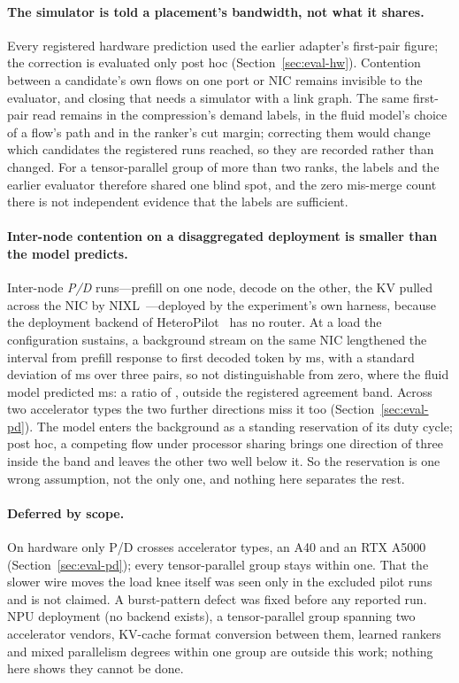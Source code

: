 \paragraph{The simulator is told a placement's bandwidth, not what it shares.}
Every registered hardware prediction used the earlier adapter's first-pair
figure; the correction is evaluated only post hoc (Section~\ref{sec:eval-hw}).
Contention between a candidate's own flows on one port or NIC remains
invisible to the evaluator, and closing that needs a simulator with a link
graph. The same first-pair read remains in the compression's demand labels,
in the fluid model's choice of a flow's path and in the ranker's cut margin;
correcting them would change which candidates the registered runs reached, so
they are recorded rather than changed. For a tensor-parallel group of more
than two ranks, the labels and the earlier evaluator therefore shared one
blind spot, and the zero mis-merge count there is not independent evidence
that the labels are sufficient.

\paragraph{Inter-node contention on a disaggregated deployment is smaller than
the model predicts.}
Inter-node \emph{P/D} runs---prefill on one node, decode on the other, the KV
pulled across the NIC by NIXL~\cite{nixl}---deployed by the experiment's own harness, because the
deployment backend of HeteroPilot~\cite{heteropilot} has no router. At a load the
configuration sustains, a background stream on the same NIC lengthened the
interval from prefill response to first decoded token by \egfivePdEffect{}
ms, with a standard deviation of \egfivePdSd{} ms over three pairs, so not
distinguishable from zero, where the fluid model predicted
\egfivePdPredicted{} ms: a ratio of \egfivePdRatio{}, outside the registered
agreement band. Across two accelerator types the two further directions miss
it too (Section~\ref{sec:eval-pd}). The model enters the background as a
standing reservation of its duty cycle; post hoc, a competing flow under
processor sharing brings one direction of three inside the band and leaves the
other two well below it. So the reservation is one wrong assumption, not the
only one, and nothing here separates the rest.

\paragraph{Deferred by scope.}
On hardware only P/D crosses accelerator types, an A40 and an RTX A5000
(Section~\ref{sec:eval-pd}); every tensor-parallel group stays within one.
That the slower wire moves the load knee itself was seen only in the excluded
pilot runs and is not claimed. A burst-pattern defect was fixed before any
reported run. NPU deployment (no backend exists), a tensor-parallel group spanning two
accelerator vendors, KV-cache format conversion between them, learned rankers
and mixed parallelism degrees within one group are outside this work; nothing
here shows they cannot be done.
